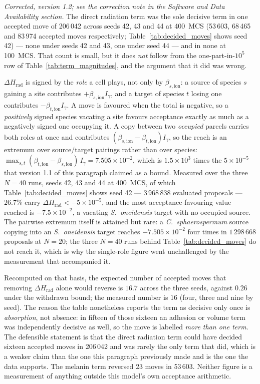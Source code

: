 \documentclass[11pt]{article}
\begin{document}
\emph{Corrected, version 1.2; see the correction note in the Software and Data Availability section.}
The direct radiation term was the sole decisive term in one accepted move of 206\,042 across seeds
42, 43 and 44 at 400~MCS (53\,603, 68\,465 and 83\,974 accepted moves respectively; Table~\ref{tab:decided_moves} shows seed 42) --- none under seeds 42 and 43, one under seed 44 --- and in none at
100~MCS. That count is small, but it does \emph{not} follow from the one-part-in-$10^5$ row of
Table~\ref{tab:term_magnitudes}, and the argument that it did was wrong.

$\Delta H_{\mathrm{rad}}$ is signed by the \emph{role} a cell plays, not only by
$\beta_{s,\mathrm{ion}}$: a source of species $s$ gaining a site contributes
$+\beta_{s,\mathrm{ion}} I_\gamma$, and a target of species $t$ losing one contributes
$-\beta_{t,\mathrm{ion}} I_\gamma$. A move is favoured when
the total is negative, so a \emph{positively} signed species vacating a site favours acceptance
exactly as much as a negatively signed one occupying it. A copy between two \emph{occupied}
parcels carries both roles at once and contributes $(\beta_{s,\mathrm{ion}} - \beta_{t,\mathrm{ion}})
I_\gamma$, so the reach is an extremum over source/target pairings rather than over species:
$\max_{s,t}(\beta_{t,\mathrm{ion}} - \beta_{s,\mathrm{ion}})\,I_\gamma = 7.505\times10^{-2}$, which is
$1.5\times10^{3}$ times the $5\times10^{-5}$ that version 1.1 of this paragraph claimed as a bound.
Measured over the three $N=40$ runs, seeds 42, 43 and 44 at 400~MCS, of which Table~\ref{tab:decided_moves} shows seed 42 --- $3\,968\,838$ evaluated proposals
--- $26.7\%$ carry
$\Delta H_{\mathrm{rad}} < -5\times10^{-5}$, and the most acceptance-favouring value reached is
$-7.5\times10^{-2}$, a vacating \emph{S.\ oneidensis} target with no occupied source. The pairwise
extremum itself is attained but rare: a \emph{C.\ sphaerospermum} source copying into an
\emph{S.\ oneidensis} target reaches $-7.505\times10^{-2}$ four times in $1\,298\,668$ proposals at
$N=20$; the three $N=40$ runs behind Table~\ref{tab:decided_moves} do not reach it, which is why the
single-role figure went unchallenged by the measurement that accompanied it.

Recomputed on that basis, the expected number of accepted moves that removing
$\Delta H_{\mathrm{rad}}$ alone would reverse is $16.7$ across the three seeds, against $0.26$ under
the withdrawn bound; the measured number is $16$ (four, three and nine by seed). The reason the
table nonetheless reports the term as decisive only once is \emph{absorption}, not absence: in
fifteen of those sixteen an adhesion or volume term was independently decisive as well, so the move
is labelled \emph{more than one term}. The defensible statement is that the direct radiation term
could have decided sixteen accepted moves in 206\,042 and was rarely the only term that did, which
is a weaker claim than the one this paragraph previously made and is the one the data supports. The
melanin term reversed 23 moves in 53\,603. Neither figure is a measurement of anything outside this
model's own acceptance arithmetic.
\end{document}
